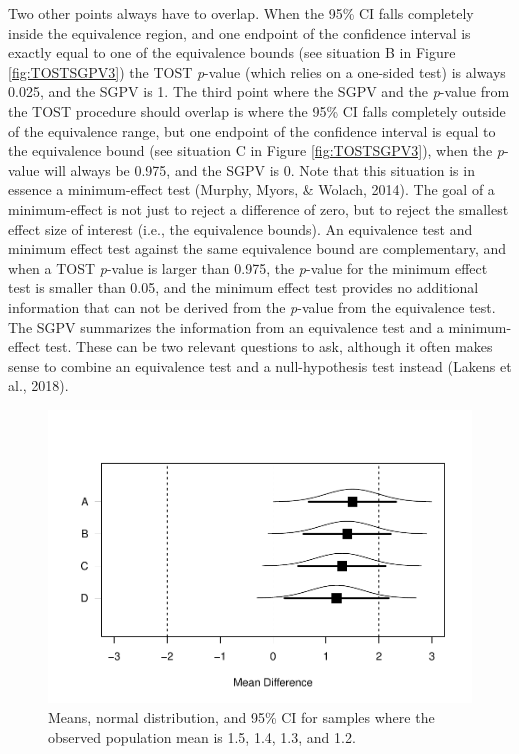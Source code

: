 \documentclass[,man,floatsintext]{apa6}
\begin{document}
Two other points always have to overlap. When the 95\% CI falls
completely inside the equivalence region, and one endpoint of the
confidence interval is exactly equal to one of the equivalence bounds
(see situation B in Figure \ref{fig:TOSTSGPV3}) the TOST \emph{p}-value
(which relies on a one-sided test) is always 0.025, and the SGPV is 1.
The third point where the SGPV and the \emph{p}-value from the TOST
procedure should overlap is where the 95\% CI falls completely outside
of the equivalence range, but one endpoint of the confidence interval is
equal to the equivalence bound (see situation C in Figure
\ref{fig:TOSTSGPV3}), when the \emph{p}-value will always be 0.975, and
the SGPV is 0. Note that this situation is in essence a minimum-effect
test (Murphy, Myors, \& Wolach, 2014). The goal of a minimum-effect is
not just to reject a difference of zero, but to reject the smallest
effect size of interest (i.e., the equivalence bounds). An equivalence
test and minimum effect test against the same equivalence bound are
complementary, and when a TOST \emph{p}-value is larger than 0.975, the
\emph{p}-value for the minimum effect test is smaller than 0.05, and the
minimum effect test provides no additional information that can not be
derived from the \emph{p}-value from the equivalence test. The SGPV
summarizes the information from an equivalence test and a minimum-effect
test. These can be two relevant questions to ask, although it often
makes sense to combine an equivalence test and a null-hypothesis test
instead (Lakens et al., 2018).

\begin{figure}
\centering
\includegraphics{manuscript.R1_files/figure-latex/TOSTSGPV4-1.pdf}
\caption{\label{fig:TOSTSGPV4}Means, normal distribution, and 95\% CI for
samples where the observed population mean is 1.5, 1.4, 1.3, and 1.2.}
\end{figure}
\end{document}
